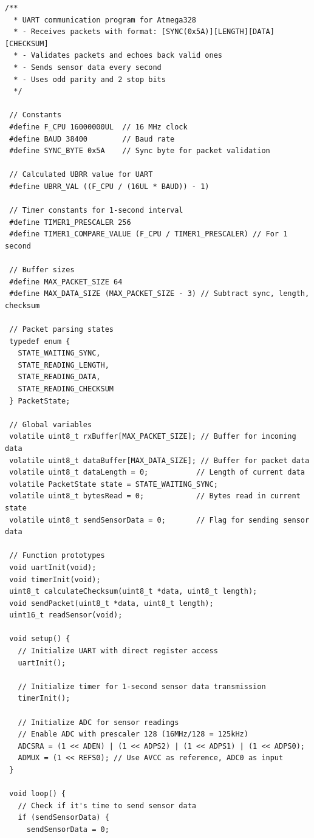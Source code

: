 \documentclass{article}
\begin{document}
\begin{lstlisting}[caption={update ino}, label={lst:example}]
  /**
  * UART communication program for Atmega328
  * - Receives packets with format: [SYNC(0x5A)][LENGTH][DATA][CHECKSUM]
  * - Validates packets and echoes back valid ones
  * - Sends sensor data every second
  * - Uses odd parity and 2 stop bits
  */
 
 // Constants
 #define F_CPU 16000000UL  // 16 MHz clock
 #define BAUD 38400        // Baud rate
 #define SYNC_BYTE 0x5A    // Sync byte for packet validation
 
 // Calculated UBRR value for UART
 #define UBRR_VAL ((F_CPU / (16UL * BAUD)) - 1)
 
 // Timer constants for 1-second interval
 #define TIMER1_PRESCALER 256
 #define TIMER1_COMPARE_VALUE (F_CPU / TIMER1_PRESCALER) // For 1 second
 
 // Buffer sizes
 #define MAX_PACKET_SIZE 64
 #define MAX_DATA_SIZE (MAX_PACKET_SIZE - 3) // Subtract sync, length, checksum
 
 // Packet parsing states
 typedef enum {
   STATE_WAITING_SYNC,
   STATE_READING_LENGTH,
   STATE_READING_DATA,
   STATE_READING_CHECKSUM
 } PacketState;
 
 // Global variables
 volatile uint8_t rxBuffer[MAX_PACKET_SIZE]; // Buffer for incoming data
 volatile uint8_t dataBuffer[MAX_DATA_SIZE]; // Buffer for packet data
 volatile uint8_t dataLength = 0;           // Length of current data
 volatile PacketState state = STATE_WAITING_SYNC;
 volatile uint8_t bytesRead = 0;            // Bytes read in current state
 volatile uint8_t sendSensorData = 0;       // Flag for sending sensor data
 
 // Function prototypes
 void uartInit(void);
 void timerInit(void);
 uint8_t calculateChecksum(uint8_t *data, uint8_t length);
 void sendPacket(uint8_t *data, uint8_t length);
 uint16_t readSensor(void);
 
 void setup() {
   // Initialize UART with direct register access
   uartInit();
   
   // Initialize timer for 1-second sensor data transmission
   timerInit();
   
   // Initialize ADC for sensor readings
   // Enable ADC with prescaler 128 (16MHz/128 = 125kHz)
   ADCSRA = (1 << ADEN) | (1 << ADPS2) | (1 << ADPS1) | (1 << ADPS0);
   ADMUX = (1 << REFS0); // Use AVCC as reference, ADC0 as input
 }
 
 void loop() {
   // Check if it's time to send sensor data
   if (sendSensorData) {
     sendSensorData = 0;
     

\end{lstlisting}
\end{document}
